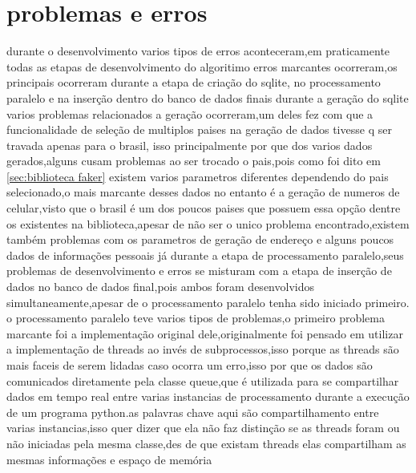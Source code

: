 \documentclass[
	12pt,				%
	openright,			%
	oneside,			%
	a4paper,			%
	english,			%
	french,				%
	spanish,			%
	brazil,				%
	]{abntex2}
\begin{document}
\chapter{problemas e erros}
\label{ch:problemas e erros}
durante o desenvolvimento varios tipos de erros aconteceram,em praticamente todas as etapas de desenvolvimento do algoritimo erros marcantes ocorreram,os principais ocorreram durante a etapa de criação do sqlite,
no processamento paralelo e na inserção dentro do banco de dados finais\newline
durante a geração do sqlite varios problemas relacionados a geração ocorreram,um deles fez com que a funcionalidade de seleção de multiplos paises na geração de dados tivesse q ser travada apenas para o brasil,
isso principalmente por que dos varios dados gerados,alguns cusam problemas ao ser trocado o pais,pois como foi dito em \autoref{sec:biblioteca faker} existem varios parametros diferentes dependendo do pais selecionado,o mais marcante desses dados no entanto é a geração de numeros de celular,visto que o brasil é um dos poucos paises que possuem essa opção dentre os existentes na biblioteca,apesar de não ser o unico problema encontrado,existem também problemas com os parametros de geração de endereço e alguns poucos dados de informações pessoais\newline
já durante a etapa de processamento paralelo,seus problemas de desenvolvimento e erros se misturam com a etapa de inserção de dados no banco de dados final,pois ambos foram desenvolvidos simultaneamente,apesar de o processamento paralelo tenha sido iniciado primeiro.\newline
o processamento paralelo teve varios tipos de problemas,o primeiro problema marcante foi a implementação original dele,originalmente foi pensado em utilizar a implementação de threads ao invés de subprocessos,isso porque as threads são mais faceis de serem lidadas caso ocorra um erro,isso por que os dados são comunicados diretamente pela classe queue,que é utilizada para se compartilhar dados em tempo real entre varias instancias de processamento durante a execução de um programa python.as palavras chave aqui são compartilhamento entre varias instancias,isso quer dizer que ela não faz distinção se as threads foram ou não iniciadas pela mesma classe,des de que existam threads elas compartilham as mesmas informações e espaço de memória\newline
\end{document}
